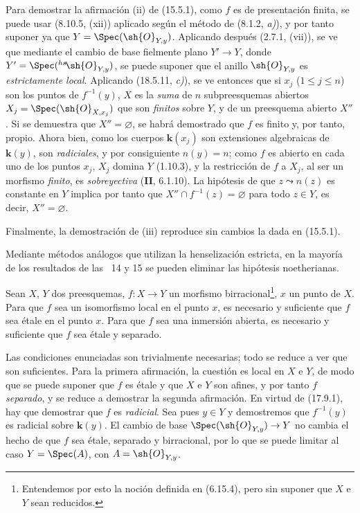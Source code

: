 Para demostrar la afirmación (ii) de (15.5.1), como $f$ es de presentación finita, se puede usar (8.10.5, (xii)) aplicado según el método de (8.1.2, \emph{a)}), y por tanto suponer ya que $Y=\Spec(\sh{O}_{Y,y})$. Aplicando después (2.7.1, (vii)), se ve que mediante el cambio de base fielmente plano $Y'\to Y$, donde $Y'=\Spec({}^{hs}\!\sh{O}_{Y,y})$, se puede suponer que el anillo $\sh{O}_{Y,y}$ es \emph{estrictamente local}. Aplicando (18.5.11, \emph{c)}), se ve entonces que si $x_j$ ($1\leq j\leq n$) son los puntos de $f^{-1}(y)$, $X$ es la \emph{suma} de $n$ subpreesquemas abiertos $X_j=\Spec(\sh{O}_{X,x_j})$ que son \emph{finitos} sobre $Y$, y de un preesquema abierto $X''$. Si se demuestra que $X''=\varnothing$, se habrá demostrado que $f$ es finito y, por tanto, propio. Ahora bien, como los cuerpos $\boldsymbol{k}(x_j)$ son extensiones algebraicas de $\boldsymbol{k}(y)$, son \emph{radiciales}, y por consiguiente $n(y)=n$; como $f$ es abierto en cada uno de los puntos $x_j$, $X_j$ domina $Y$ (1.10.3), y la restricción de $f$ a $X_j$, al ser un morfismo \emph{finito}, es \emph{sobreyectiva} (\textbf{II}, 6.1.10). La hipótesis de que $z\leadsto n(z)$ es constante en $Y$ implica por tanto que $X''\cap f^{-1}(z)=\varnothing$ para todo $z\in Y$, es decir, $X''=\varnothing$.

Finalmente, la demostración de (iii) reproduce sin cambios la dada en (15.5.1).

\begin{env}[18.10.17.2]
\label{IV.18.10.17.2}
Mediante métodos análogos que utilizan la henselización estricta, en la mayoría de los resultados de las \textsection\textsection~14 y 15 se pueden eliminar las hipótesis noetherianas.
\end{env}

\begin{lemma}[18.10.18]
\label{IV.18.10.18}
Sean $X$, $Y$ dos preesquemas, $f:X\to Y$ un morfismo birracional\footnote{Entendemos por esto la noción definida en (6.15.4), pero sin suponer que $X$ e $Y$ sean reducidos.}, $x$ un punto de $X$. Para que $f$ sea un isomorfismo local en el punto $x$, es necesario y suficiente que $f$ sea étale en el punto $x$. Para que $f$ sea una inmersión abierta, es necesario y suficiente que $f$ sea étale y separado.
\end{lemma}

Las condiciones enunciadas son trivialmente necesarias; todo se reduce a ver que son suficientes. Para la primera afirmación, la cuestión es local en $X$ e $Y$, de modo que se puede suponer que $f$ es étale y que $X$ e $Y$ son afines, y por tanto $f$ \emph{separado}, y se reduce a demostrar la segunda afirmación. En virtud de (17.9.1), hay que demostrar que $f$ es \emph{radicial}. Sea pues $y\in Y$ y demostremos que $f^{-1}(y)$ es radicial sobre $\boldsymbol{k}(y)$. El cambio de base $\Spec(\sh{O}_{Y,y})\to Y$ no cambia el hecho de que $f$ sea étale, separado y birracional, por lo que se puede limitar al caso $Y=\Spec(A)$, con $A=\sh{O}_{Y,y}$.




